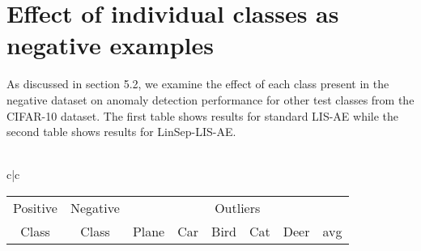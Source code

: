 \documentclass[acmtog, nonacm]{acmart}
\begin{document}
\section{Effect of individual classes as negative examples}
As discussed in section 5.2, we examine the effect of each class present in the negative dataset on anomaly detection performance for other test classes from the CIFAR-10 dataset. The first table shows results for standard LIS-AE while the second table shows results for LinSep-LIS-AE.
\\\\
\begin{tabular}{c|c}
     
\begin{tabular}{@{}c|c|ccccc|c@{}}
\midrule
Positive & Negative&\multicolumn{6}{c}{Outliers} \\
\hspace{.25em}Class &\hspace{.25em}Class & Plane & Car  & Bird & Cat  & Deer & avg\\
\midrule


\end{tabular}
\end{tabular}
\end{document}
